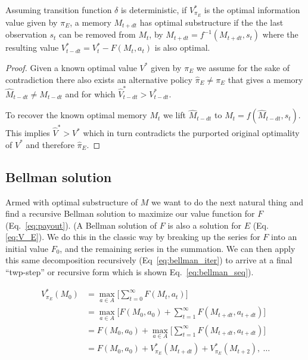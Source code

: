 \begin{theorem} \label{theorem:opt_sub} 
	Assuming transition function $\delta$ is deterministic, if $V^*_{\pi_E}$ is the optimal information value given by $\pi_E$, a memory $M_{t+dt}$ has optimal substructure if the the last observation $s_t$ can be removed from $M_t$, by $M_{t+dt} = f^{-1}(M_{t+dt}, s_t)$ where the resulting value $V^*_{t-dt} = V^*_{t} - F(M_t, a_t)$ is also optimal. 
\end{theorem}
\begin{proof}
	Given a known optimal value $V^*$ given by $\pi_E$ we assume for the sake of contradiction there also exists an alternative policy $\hat \pi_E \neq \pi_E$ that gives a memory $\hat M_{t-dt} \neq M_{t-dt}$ and for which $\hat V^*_{t-dt} > V^*_{t-dt}$. 
	
	To recover the known optimal memory $M_t$ we lift $\hat M_{t-dt}$ to $M_t = f(\hat M_{t-dt}, s_t)$. This implies $\hat V^* > V^*$ which in turn contradicts the purported original optimality of $V^*$ and therefore $\hat \pi_E$.
\end{proof}

\subsection*{Bellman solution} Armed with optimal substructure of $M$ we want to do the next natural thing and find a recursive Bellman solution to maximize our value function for $F$ (Eq.~\ref{eq:payout}). (A Bellman solution of $F$ is also a solution for $E$ (Eq.\ref{eq:V_E}). We do this in the classic way by breaking up the series for $F$ into an initial value $F_0$, and the remaining series in the summation. We can then apply this same decomposition recursively (Eq~\ref{eq:bellman_iter}) to arrive at a final ``twp-step'' or recursive form which is shown Eq.~\ref{eq:bellman_seq}). 

\begin{equation}\label{eq:bellman_seq} 
	\begin{split}
		V^*_{\pi_E}(M_0) &= \max_{a \in A} \Big [\sum_{t=0}^{\infty} F(M_t, a_t)\Big ]\\
		&= \max_{a \in A} \Big [F(M_0, a_0) + \sum^{\infty}_{t=1} F(M_{t+dt}, a_{t+dt})\Big ]\\
		&= F(M_0, a_0) + \max_{a \in A} \Big [\sum_{t=1}^{\infty} F(M_{t+dt}, a_{t+dt}) \Big ]\\
		&= F(M_0, a_0) + V^*_{\pi_E}(M_{t+dt}) + V^*_{\pi_E}(M_{t+2}),\ \ldots 
	\end{split}
\end{equation}

